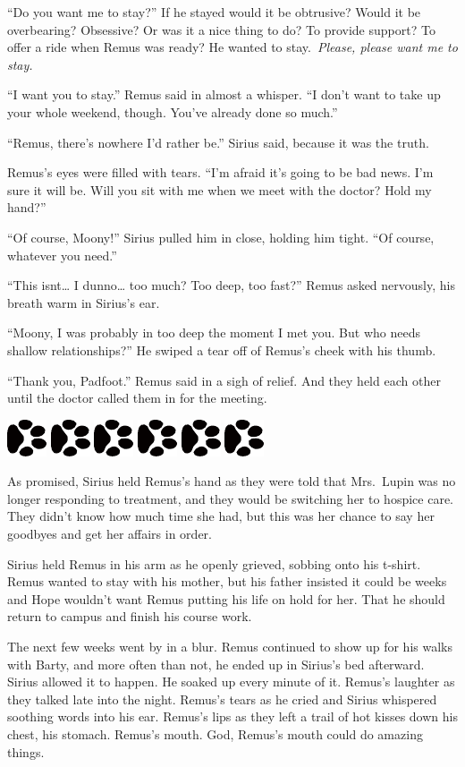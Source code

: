 \documentclass[12pt,twoside,openright]{memoir}
\newcommand{\myrulez}{	
	\begin{center}
		\hspace{.5em}
		\includegraphics[angle=60]{dogprint.pdf}
		\hspace{.5em}
		\includegraphics[angle=120]{dogprint.pdf}
		\hspace{.5em}
		\includegraphics[angle=60]{dogprint.pdf}
		\hspace{.5em}
		\includegraphics[angle=120]{dogprint.pdf}
		\hspace{.5em}
		\includegraphics[angle=60]{dogprint.pdf}
		\hspace{.5em}
		\includegraphics[angle=120]{dogprint.pdf}
		\hspace{.5em}
	\end{center}
}
\begin{document}
``Do you want me to stay?'' If he stayed would it be obtrusive? Would it be overbearing? Obsessive? Or was it a nice thing to do? To provide support? To offer a ride when Remus was ready? He wanted to stay.\ \textit{Please, please want me to stay. }

``I want you to stay.'' Remus said in almost a whisper. ``I don't want to take up your whole weekend, though. You've already done so much.''

``Remus, there's nowhere I'd rather be.'' Sirius said, because it was the truth.

Remus's eyes were filled with tears. ``I'm afraid it's going to be bad news. I'm sure it will be. Will you sit with me when we meet with the doctor? Hold my hand?''

``Of course, Moony!'' Sirius pulled him in close, holding him tight. ``Of course, whatever you need.''

``This isnt… I dunno… too much? Too deep, too fast?'' Remus asked nervously, his breath warm in Sirius's ear.

``Moony, I was probably in too deep the moment I met you. But who needs shallow relationships?'' He swiped a tear off of Remus's cheek with his thumb.

``Thank you, Padfoot.'' Remus said in a sigh of relief. And they held each other until the doctor called them in for the meeting.

\myrulez

As promised, Sirius held Remus's hand as they were told that Mrs.\ Lupin was no longer responding to treatment, and they would be switching her to hospice care. They didn't know how much time she had, but this was her chance to say her goodbyes and get her affairs in order.

Sirius held Remus in his arm as he openly grieved, sobbing onto his t-shirt. Remus wanted to stay with his mother, but his father insisted it could be weeks and Hope wouldn't want Remus putting his life on hold for her. That he should return to campus and finish his course work.

The next few weeks went by in a blur. Remus continued to show up for his walks with Barty, and more often than not, he ended up in Sirius's bed afterward. Sirius allowed it to happen. He soaked up every minute of it. Remus's laughter as they talked late into the night. Remus's tears as he cried and Sirius whispered soothing words into his ear. Remus's lips as they left a trail of hot kisses down his chest, his stomach. Remus's mouth. God, Remus's mouth could do amazing things. 
\end{document}
